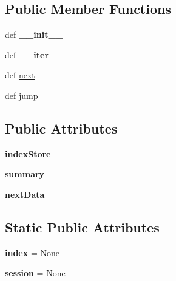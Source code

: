\subsection*{Public Member Functions}
\begin{DoxyCompactItemize}
\item 
\hypertarget{classcheshire3_1_1index_1_1_index_iter_a014a7203e4e8d8633f80887ae628df03}{def {\bfseries \-\_\-\-\_\-init\-\_\-\-\_\-}}\label{classcheshire3_1_1index_1_1_index_iter_a014a7203e4e8d8633f80887ae628df03}

\item 
\hypertarget{classcheshire3_1_1index_1_1_index_iter_ac3d731b1d010742c4c6b797f225d7d46}{def {\bfseries \-\_\-\-\_\-iter\-\_\-\-\_\-}}\label{classcheshire3_1_1index_1_1_index_iter_ac3d731b1d010742c4c6b797f225d7d46}

\item 
def \hyperlink{classcheshire3_1_1index_1_1_index_iter_a4630e8d552346dc4411478d77232f02e}{next}
\item 
def \hyperlink{classcheshire3_1_1index_1_1_index_iter_aea61165ccccc931b31ea508468aec07b}{jump}
\end{DoxyCompactItemize}
\subsection*{Public Attributes}
\begin{DoxyCompactItemize}
\item 
\hypertarget{classcheshire3_1_1index_1_1_index_iter_a95cef3edc2a2f4f851338a41cc0c3439}{{\bfseries index\-Store}}\label{classcheshire3_1_1index_1_1_index_iter_a95cef3edc2a2f4f851338a41cc0c3439}

\item 
\hypertarget{classcheshire3_1_1index_1_1_index_iter_a0a7a68ff15416ab78ac6ed5d49b01637}{{\bfseries summary}}\label{classcheshire3_1_1index_1_1_index_iter_a0a7a68ff15416ab78ac6ed5d49b01637}

\item 
\hypertarget{classcheshire3_1_1index_1_1_index_iter_a50330c43364f167ec86f72cb68514b23}{{\bfseries next\-Data}}\label{classcheshire3_1_1index_1_1_index_iter_a50330c43364f167ec86f72cb68514b23}

\end{DoxyCompactItemize}
\subsection*{Static Public Attributes}
\begin{DoxyCompactItemize}
\item 
\hypertarget{classcheshire3_1_1index_1_1_index_iter_aedb43d07e2b1437b16187293f2c3213b}{{\bfseries index} = None}\label{classcheshire3_1_1index_1_1_index_iter_aedb43d07e2b1437b16187293f2c3213b}

\item 
\hypertarget{classcheshire3_1_1index_1_1_index_iter_ad59c3b65d2581d936f7ef6607370cdeb}{{\bfseries session} = None}\label{classcheshire3_1_1index_1_1_index_iter_ad59c3b65d2581d936f7ef6607370cdeb}

\end{DoxyCompactItemize}


